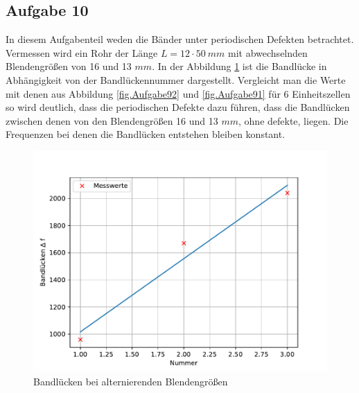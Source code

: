 \subsection{Aufgabe 10}
In diesem Aufgabenteil weden die Bänder unter periodischen Defekten betrachtet.
Vermessen wird ein Rohr der Länge $L=12 \cdot \SI{50}{mm}$ mit abwechselnden Blendengrößen von 16 und 13 $\si{mm}$.
In der Abbildung \ref{fig.Aufgabe10} ist die Bandlücke in Abhängigkeit von der Bandlückennummer dargestellt.
Vergleicht man die Werte mit denen aus Abbildung \ref{fig.Aufgabe92} und \ref{fig.Aufgabe91} für 6 Einheitszellen so wird deutlich, dass
die periodischen Defekte dazu führen, dass die Bandlücken zwischen denen von den Blendengrößen 16 und 13 $\si{mm}$, ohne defekte, liegen.
Die Frequenzen bei denen die Bandlücken entstehen bleiben konstant.
  \begin{figure}[h!]
    \centering
    \includegraphics[width=\textwidth]{A10.pdf}
    \caption{Bandlücken bei alternierenden Blendengrößen}
    \label{fig.Aufgabe10}
  \end{figure}
  \FloatBarrier


